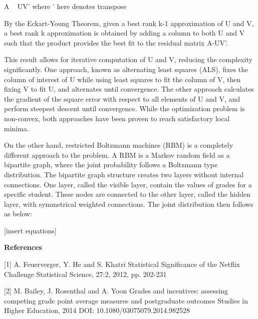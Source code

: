 \documentclass[12pt]{article}
\begin{document}
A ~ UV'    where ' here denotes transpose

By the Eckart-Young Theorem, given a best rank k-1 approximation
of U and V, a best rank k approximation is obtained by adding
a column to both U and V such that the product provides the
best fit to the residual matrix A-UV'.

This result allows for iterative computation of U and V,
reducing the complexity significantly.
One approach, known as alternating least squares (ALS),
fixes the column of interest of U while using least squares
to fit the column of V, then fixing V to fit U,
and alternates until convergence.
The other approach calculates the gradient of the square error
with respect to all elements of U and V,
and perform steepest descent until convergence.
While the optimization problem is non-convex,
both approaches have been proven to reach satisfactory 
local minima.

On the other hand, restricted Boltzmann machines (RBM) is a
completely different approach to the problem.
A RBM is a Markov random field as a bipartite graph,
where the joint probability follows a Boltzmann type distribution.
The bipartite graph structure creates two layers without
internal connections.
One layer, called the visible layer, contain the values of 
grades for a specific student.
These nodes are connected to the other layer, called the hidden layer,
with symmetrical weighted connections.
The joint distribution then follows as below:

[insert equations]










\medskip
\noindent
{\bf References}

[1] A. Feuerverger, Y. He and S. Khatri
Statistical Significance of the Netflix Challenge
Statistical Science, 27:2, 2012, pp. 202-231

[2] M. Bailey, J. Rosenthal and A. Yoon
Grades and incentives: assessing competing grade point 
average measures and postgraduate outcomes
Studies in Higher Education, 2014
DOI: 10.1080/03075079.2014.982528
\end{document}

